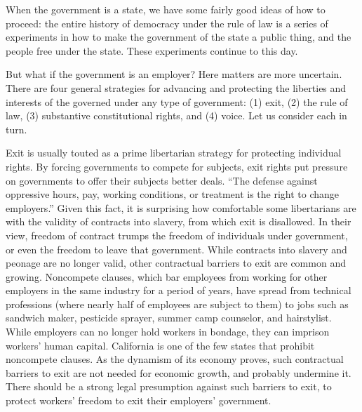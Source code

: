 \documentclass[
  letterpaper,
  11pt,
  DIV=9,
  openright]{scrbook}
\begin{document}
When the government is a state, we have some fairly good ideas of how to
proceed: the entire history of democracy under the rule of law is a
series of experiments in how to make the government of the state a
public thing, and the people free under the state. These experiments
continue to this day.

But what if the government is an employer? Here matters are more
uncertain. There are four general strategies for advancing and
protecting the liberties and interests of the governed under any type of
government: (1) exit, (2) the rule of law, (3) substantive
constitutional rights, and (4) voice. Let us consider each in turn.

Exit is usually touted as a prime libertarian strategy for protecting
individual rights. By forcing governments to compete for subjects, exit
rights put pressure on governments to offer their subjects better deals.
``The defense against oppressive hours, pay, working conditions, or
treatment is the right to change employers.'' Given this fact, it is
surprising how comfortable some libertarians are with the validity of
contracts into slavery, from which exit is disallowed. In their view,
freedom of contract trumps the freedom of individuals under government,
or even the freedom to leave that government. While contracts into
slavery and peonage are no longer valid, other contractual barriers to
exit are common and growing. Noncompete clauses, which bar employees
from working for other employers in the same industry for a period of
years, have spread from technical professions (where nearly half of
employees are subject to them) to jobs such as sandwich maker, pesticide
sprayer, summer camp counselor, and hairstylist. While employers can no
longer hold workers in bondage, they can imprison workers' human
capital. California is one of the few states that prohibit noncompete
clauses. As the dynamism of its economy proves, such contractual
barriers to exit are not needed for economic growth, and probably
undermine it. There should be a strong legal presumption against such
barriers to exit, to protect workers' freedom to exit their employers'
government.
\end{document}
